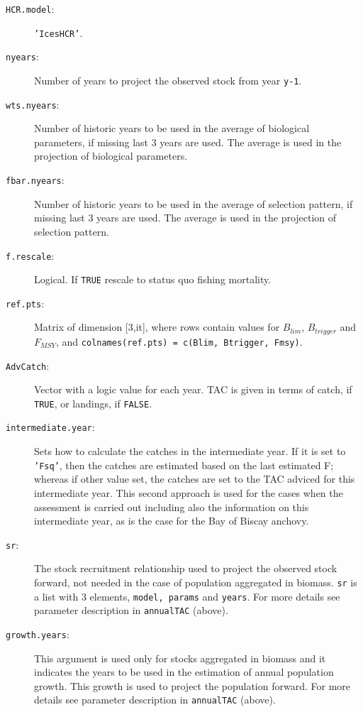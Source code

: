 	  \begin{description}
	    \item[\texttt{HCR.model}:] \texttt{'IcesHCR'}.
	    \item[\texttt{nyears}:] Number of years to project the observed stock from year \texttt{y-1}.
		  \item[\texttt{wts.nyears}:] Number of historic years to be used in the average of biological parameters, if missing last 3 years are used. The average is used in the projection of biological parameters.
		  \item[\texttt{fbar.nyears}:] Number of historic years to be used in the average of selection pattern, if missing last 3 years are used. The average is used in the projection of selection pattern.
		  \item[\texttt{f.rescale}:] Logical.  If \texttt{TRUE} rescale to status quo fishing mortality.
		  \item[\texttt{ref.pts}:] Matrix of dimension [3,it], 
		    where rows contain values for $B_{lim}$, $B_{trigger}$ and $F_{MSY}$,
		    and \texttt{colnames(ref.pts) = c(Blim, Btrigger, Fmsy)}.
		  \item[\texttt{AdvCatch}:] Vector with a logic value for each year. TAC is given in terms of catch, if \texttt{TRUE}, or landings, if \texttt{FALSE}.
		  \item[\texttt{intermediate.year}:] Sets how to calculate the catches in the intermediate year. 
		    If it is set to \texttt{'Fsq'}, then the catches are estimated based on the last estimated F; 
		    whereas if other value set, the catches are set to the TAC adviced for this intermediate year. 
		    This second approach is used for the cases when the assessment is carried out including also the 
		    information on this intermediate year, as is the case for the Bay of Biscay anchovy.
		  \item[\texttt{sr}:] The stock recruitment relationship used to project the observed stock forward, not needed in the case of population aggregated in biomass. \texttt{sr} is a list with 3 elements, \texttt{model, params} and \texttt{years}. For more details see parameter description in \texttt{annualTAC} (above).
		  \item[\texttt{growth.years}:] This argument is used only for stocks aggregated in biomass and it indicates the years
			to be used in the estimation of annual population growth. This growth is used to project the population forward. 
			For more details see parameter description in \texttt{annualTAC} (above).
	\end{description}


